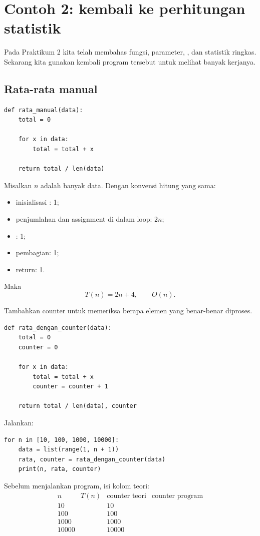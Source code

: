 \documentclass[11pt,a4paper]{report}
\newcommand{\kode}[1]{\texttt{\detokenize{#1}}}
\begin{document}
\section{Contoh 2: kembali ke perhitungan statistik}

Pada Praktikum 2 kita telah membahas fungsi, parameter, \kode{return}, dan statistik ringkas.
Sekarang kita gunakan kembali program tersebut untuk melihat banyak kerjanya.

\subsection{Rata-rata manual}

\begin{lstlisting}
def rata_manual(data):
    total = 0

    for x in data:
        total = total + x

    return total / len(data)
\end{lstlisting}

Misalkan $n$ adalah banyak data. Dengan konvensi hitung yang sama:
\begin{itemize}
  \item inisialisasi \kode{total}: 1;
  \item penjumlahan dan assignment di dalam loop: $2n$;
  \item \kode{len(data)}: 1;
  \item pembagian: 1;
  \item return: 1.
\end{itemize}

Maka
\[
T(n)=2n+4,
\qquad
O(n).
\]

Tambahkan counter untuk memeriksa berapa elemen yang benar-benar diproses.

\begin{lstlisting}
def rata_dengan_counter(data):
    total = 0
    counter = 0

    for x in data:
        total = total + x
        counter = counter + 1

    return total / len(data), counter
\end{lstlisting}

Jalankan:

\begin{lstlisting}
for n in [10, 100, 1000, 10000]:
    data = list(range(1, n + 1))
    rata, counter = rata_dengan_counter(data)
    print(n, rata, counter)
\end{lstlisting}

Sebelum menjalankan program, isi kolom teori:
\[
\begin{array}{c|c|c|c}
n&T(n)&\text{counter teori}&\text{counter program}\\\hline
10&&10&\\
100&&100&\\
1000&&1000&\\
10000&&10000&
\end{array}
\]
\end{document}
